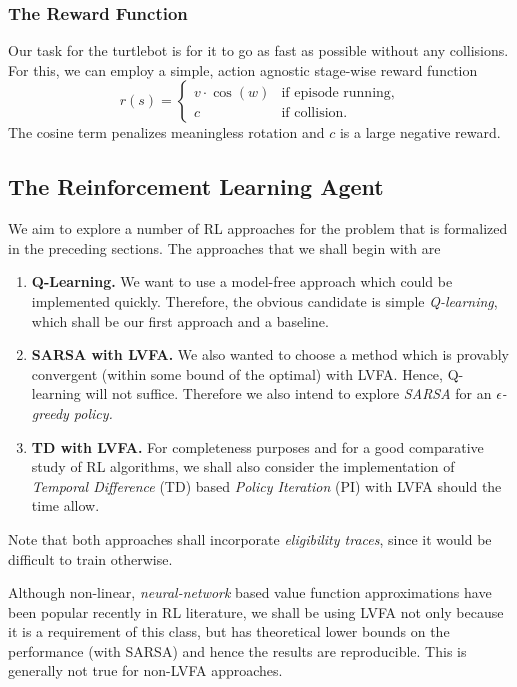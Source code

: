 \documentclass{article}
\begin{document}
\subsubsection{The Reward Function}
Our task for the turtlebot is for it to go as fast as possible without any collisions. For this, we can employ a simple, action agnostic stage-wise reward function
\begin{equation*}
  r(s) =
  \begin{cases}
    v \cdot \cos(w) & \text{if episode running,} \\
    c & \text{if collision.}
  \end{cases}
\end{equation*}
The cosine term penalizes meaningless rotation and $c$ is a large negative reward.

\subsection{The Reinforcement Learning Agent}
We aim to explore a number of RL approaches for the problem that is formalized in the preceding sections. The approaches that we shall begin with are
\begin{enumerate}
    \item {\bf Q-Learning.} We want to use a model-free approach which could be implemented quickly. Therefore, the obvious candidate is simple {\it Q-learning}, which shall be our first approach and a baseline.
    \item {\bf SARSA with LVFA.} We also wanted to choose a method which is provably convergent (within some bound of the optimal) with LVFA. Hence, Q-learning will not suffice. Therefore we also intend to explore {\it SARSA} for an {\it $\epsilon$-greedy policy.}
    \item {\bf TD with LVFA.} For completeness purposes and for a good comparative study of RL algorithms, we shall also consider the implementation of {\it Temporal Difference} (TD) based {\it Policy Iteration} (PI) with LVFA should the time allow.
\end{enumerate}
Note that both approaches shall incorporate {\it eligibility traces}, since it would be difficult to train otherwise.

Although non-linear, {\it neural-network} based value function approximations have been popular recently in RL literature, we shall be using LVFA not only because it is a requirement of this class, but has theoretical lower bounds on the performance (with SARSA) and hence the results are reproducible. This is generally not true for non-LVFA approaches.
\end{document}
